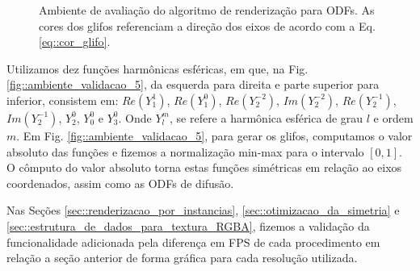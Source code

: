 \documentclass[
    12pt,                %
    oneside,            %
    a4paper,            %
    english,            %
    french,                %
    spanish,            %
    brazil                %
    ]{abntex2}
\begin{document}
\begin{figure}[ht]
     \caption{Ambiente de avaliação do algoritmo de renderização para ODFs. As cores dos glifos referenciam a direção dos eixos de acordo com a Eq. \ref{eq::cor_glifo}.}
    \label{fig::ambiente_validacao}
\end{figure}

Utilizamos dez funções harmônicas esféricas, em que, na Fig. \ref{fig::ambiente_validacao_5}, da esquerda para direita e parte superior para inferior, consistem em: $Re(Y_1^1)$,
$Re(Y_1^0)$,
$Re(Y_2^{-2})$,
$Im(Y_2^{-2})$,
$Re(Y_2^{-1})$,
$Im(Y_2^{-1})$,
$Y_2^0$,
$Y_0^0$ e
$Y_3^0$. Onde $Y_l^m$, se refere a harmônica esférica de grau $l$ e ordem $m$. Em Fig. \ref{fig::ambiente_validacao_5}, para gerar os glifos, computamos o valor absoluto das funções e fizemos a normalização min-max para o intervalo $[0, 1]$. O cômputo do valor absoluto torna estas funções simétricas em relação ao eixos coordenados, assim como as ODFs de difusão.

Nas Seções \ref{sec::renderizacao_por_instancias}, \ref{sec::otimizacao_da_simetria} e \ref{sec::estrutura_de_dados_para_textura_RGBA}, fizemos a validação da funcionalidade adicionada pela diferença em FPS de cada procedimento em relação a seção anterior de forma gráfica para cada resolução utilizada.
\end{document}
